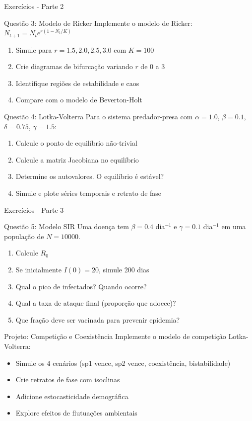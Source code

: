 \begin{frame}{Exercícios - Parte 2}
\begin{block}{Questão 3: Modelo de Ricker}
Implemente o modelo de Ricker: $N_{t+1} = N_t e^{r(1-N_t/K)}$
\begin{enumerate}
    \item Simule para $r = 1.5, 2.0, 2.5, 3.0$ com $K = 100$
    \item Crie diagramas de bifurcação variando $r$ de 0 a 3
    \item Identifique regiões de estabilidade e caos
    \item Compare com o modelo de Beverton-Holt
\end{enumerate}
\end{block}

\begin{block}{Questão 4: Lotka-Volterra}
Para o sistema predador-presa com $\alpha = 1.0$, $\beta = 0.1$, $\delta = 0.75$, $\gamma = 1.5$:
\begin{enumerate}
    \item Calcule o ponto de equilíbrio não-trivial
    \item Calcule a matriz Jacobiana no equilíbrio
    \item Determine os autovalores. O equilíbrio é estável?
    \item Simule e plote séries temporais e retrato de fase
\end{enumerate}
\end{block}
\end{frame}

\begin{frame}{Exercícios - Parte 3}
\begin{block}{Questão 5: Modelo SIR}
Uma doença tem $\beta = 0.4$ dia$^{-1}$ e $\gamma = 0.1$ dia$^{-1}$ em uma população de $N = 10000$.
\begin{enumerate}
    \item Calcule $R_0$
    \item Se inicialmente $I(0) = 20$, simule 200 dias
    \item Qual o pico de infectados? Quando ocorre?
    \item Qual a taxa de ataque final (proporção que adoece)?
    \item Que fração deve ser vacinada para prevenir epidemia?
\end{enumerate}
\end{block}

\begin{alertblock}{Projeto: Competição e Coexistência}
Implemente o modelo de competição Lotka-Volterra:
\begin{itemize}
    \item Simule os 4 cenários (sp1 vence, sp2 vence, coexistência, bistabilidade)
    \item Crie retratos de fase com isoclinas
    \item Adicione estocasticidade demográfica
    \item Explore efeitos de flutuações ambientais
\end{itemize}
\end{alertblock}
\end{frame}

